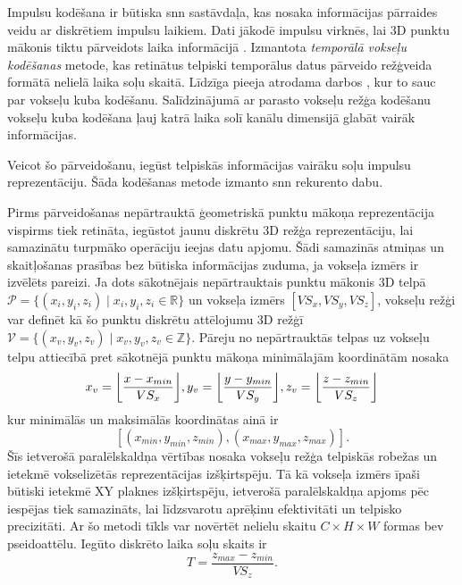 Impulsu kodēšana ir būtiska \Gls{snn} sastāvdaļa, kas nosaka informācijas pārraides veidu ar diskrētiem impulsu laikiem. Dati
jākodē impulsu virknēs, lai 3D punktu mākonis tiktu pārveidots laika informācijā \cite{safa2021}. Izmantota \textit{temporālā
vokseļu kodēšanas}  metode,
kas retinātus telpiski temporālus datus pārveido režģveida formātā nelielā laika soļu skaitā. Līdzīga pieeja atrodama darbos
\cite{Cordone2022, fan2025}, kur to sauc par vokseļu kuba kodēšanu. Salīdzinājumā ar parasto vokseļu režģa kodēšanu
\cite{bardow2016} vokseļu kuba kodēšana ļauj katrā laika solī kanālu dimensijā glabāt vairāk informācijas.

Veicot šo pārveidošanu, iegūst telpiskās informācijas vairāku soļu impulsu reprezentāciju. Šāda kodēšanas metode izmanto \Gls{snn} rekurento dabu.

Pirms pārveidošanas nepārtrauktā ģeometriskā punktu mākoņa reprezentācija vispirms tiek retināta, iegūstot jaunu diskrētu 3D režģa reprezentāciju, lai samazinātu turpmāko operāciju ieejas datu apjomu. Šādi samazinās atmiņas un skaitļošanas prasības bez būtiska informācijas zuduma, ja vokseļa izmērs ir izvēlēts pareizi. Ja dots sākotnējais nepārtrauktais punktu mākonis 3D telpā \(\mathcal{P} = \{(x_i, y_i, z_i) \mid x_i, y_i, z_i \in \mathbb{R}\}\) un vokseļa izmērs \([VS_x, VS_y, VS_z]\), vokseļu režģi var definēt kā šo punktu diskrētu attēlojumu 3D režģī \(\mathcal{V} = \{(x_v, y_v, z_v) \mid x_v, y_v, z_v \in \mathbb{Z}\}\). Pāreju no nepārtrauktās telpas uz vokseļu telpu attiecībā pret sākotnējā punktu mākoņa minimālajām koordinātām nosaka
\begin{equation}
  \begin{split}
    x_v = \floor*{\frac{x - x_{min}}{VS_x}},
    y_v = \floor*{\frac{y - y_{min}}{VS_y}},
    z_v = \floor*{\frac{z - z_{min}}{VS_z}}
  \end{split}
\label{eq:voxels}
\end{equation}
kur minimālās un maksimālās koordinātas ainā ir
$$[(x_{min}, y_{min}, z_{min}), (x_{max}, y_{max}, z_{max})].$$
Šīs ietverošā paralēlskaldņa vērtības nosaka vokseļu režģa telpiskās robežas un ietekmē vokselizētās reprezentācijas izšķirtspēju. Tā kā vokseļa izmērs īpaši būtiski ietekmē XY plaknes izšķirtspēju, ietverošā paralēlskaldņa apjoms pēc iespējas tiek samazināts, lai līdzsvarotu aprēķinu efektivitāti un telpisko precizitāti. Ar šo metodi tīkls var novērtēt nelielu skaitu \(C \times H \times W\) formas \Gls{bev} pseidoattēlu. Iegūto diskrēto laika soļu skaits ir
\begin{equation}
  T = \frac{z_{max} - z_{min}}{VS_z}.
  \label{eq:T}
\end{equation}

